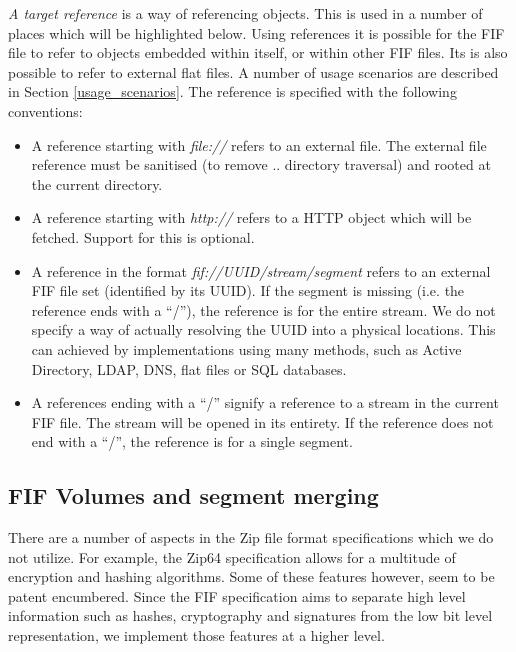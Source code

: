 \documentclass[10pt, conference]{IEEEtran}
\begin{document}
\label{target_reference}
{\em A target reference} is a way of referencing objects. This is used
in a number of places which will be highlighted below. Using
references it is possible for the FIF file to refer to objects
embedded within itself, or within other FIF files. Its is also
possible to refer to external flat files. A number of usage scenarios
are described in Section \ref{usage_scenarios}. The reference is
specified with the following conventions:

\begin{itemize}
\item A reference starting with {\em file://} refers to an external
file. The external file reference must be sanitised (to remove
.. directory traversal) and rooted at the current directory.

\item A reference starting with {\em http://} refers to a HTTP
object which will be fetched. Support for this is optional.

\item A reference in the format {\em fif://UUID/stream/segment} refers
to an external FIF file set (identified by its UUID). If the segment
is missing (i.e. the reference ends with a ``/''), the reference is
for the entire stream. We do not specify a way of actually resolving
the UUID into a physical locations. This can achieved by
implementations using many methods, such as Active Directory, LDAP,
DNS, flat files or SQL databases.

\item A references ending with a ``/'' signify a reference to a
stream in the current FIF file. The stream will be opened in its
entirety. If the reference does not end with a ``/'', the reference is
for a single segment.
\end{itemize}

\subsection{FIF Volumes and segment merging}
There are a number of aspects in the Zip file format specifications
which we do not utilize. For example, the Zip64 specification allows
for a multitude of encryption and hashing algorithms. Some of these
features however, seem to be patent encumbered. Since the FIF
specification aims to separate high level information such as hashes,
cryptography and signatures from the low bit level representation, we
implement those features at a higher level.
\end{document}
